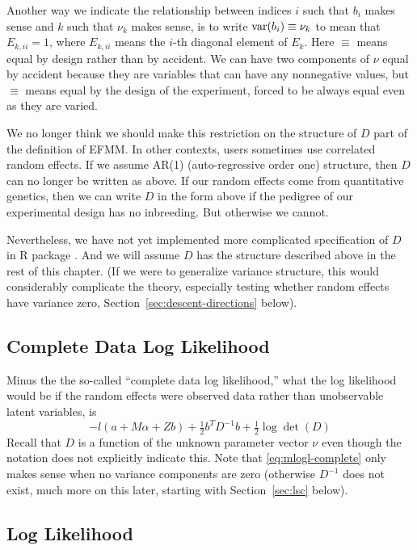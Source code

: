 Another way we indicate the relationship between indices $i$ such that $b_i$
makes sense and $k$ such that $\nu_k$ makes sense, is to write
$\operatorname{var}(b_i) \equiv \nu_k$ to mean that $E_{k, i i} = 1$, where $E_{k, i i}$
means the $i$-th diagonal element of $E_k$.  Here
$\equiv$ means equal by design rather than by accident.  We can have
two components of $\nu$ equal by accident because they are variables
that can have any nonnegative values,
but $\equiv$ means equal by the design of the experiment,
forced to be always equal even as they are varied.

We no longer think we should make this restriction on the structure of $D$
part of the definition of EFMM.  In other contexts, users sometimes use
correlated random effects.  If we assume AR(1) (auto-regressive order one)
structure, then $D$ can no longer be written as above.  If our random effects
come from quantitative genetics, then we can write $D$ in the form above if
the pedigree of our experimental design has no inbreeding.  But otherwise we
cannot.

Nevertheless, we have not yet implemented more complicated
specification of $D$ in R package .
And we will assume $D$ has the structure described above in the rest of this
chapter.
(If we were to generalize variance structure, this would considerably
complicate the theory, especially testing whether random effects have
variance zero, Section~\ref{sec:descent-directions} below).

\subsection{Complete Data Log Likelihood}

Minus the the so-called ``complete data log likelihood,''
what the log likelihood would
be if the random effects were observed data rather than unobservable latent
variables, is
\begin{equation} \label{eq:mlogl-complete}
   - l(a + M \alpha + Z b) + \tfrac{1}{2} b^T D^{-1} b
   + \tfrac{1}{2} \log \det(D)
\end{equation}
Recall that $D$ is a function of the unknown parameter vector $\nu$
even though the notation does not explicitly indicate this.
Note that \eqref{eq:mlogl-complete} only makes sense when no variance
components are zero (otherwise $D^{-1}$ does not exist, much more on this
later, starting with Section~\ref{sec:lsc} below).

\subsection{Log Likelihood}

